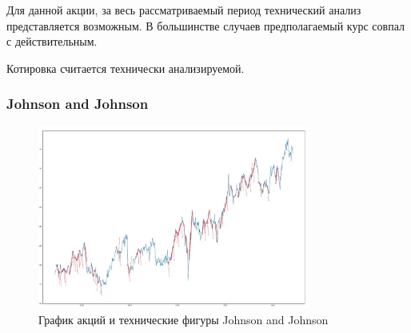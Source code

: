 \documentclass[bachelor, och, coursework]{SCWorks}
\begin{document}
    Для данной акции, за весь рассматриваемый период технический анализ 
    представляется возможным. В большинстве случаев предполагаемый курс совпал с 
    действительным.
    
    Котировка считается технически анализируемой.

    \subsubsection{Johnson and Johnson}
    
    \begin{figure}[H]
        \centering
        \includegraphics[width=0.8\textwidth]{pic/JNJ.jpg}
        \caption{График акций и технические фигуры Johnson and Johnson}
    \end{figure}
    
    \pagebreak
\end{document}
